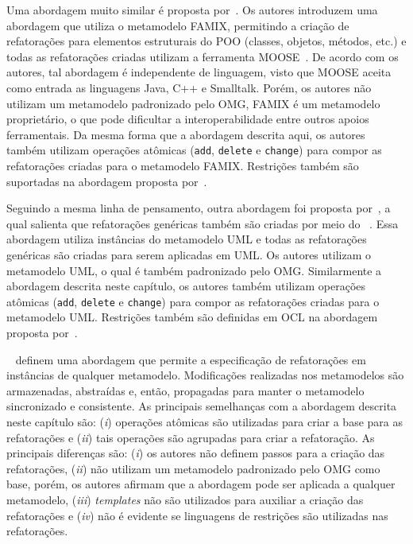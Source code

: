 Uma abordagem muito similar é proposta por~. Os autores introduzem uma abordagem que utiliza o metamodelo FAMIX, permitindo a criação de refatorações para elementos estruturais do POO (classes, objetos, métodos, etc.) e todas as refatorações criadas utilizam a ferramenta MOOSE~\cite{ducasse2005moose}. De acordo com os autores, tal abordagem é independente de linguagem, visto que MOOSE aceita como entrada as linguagens Java, C++ e Smalltalk. Porém, os autores não utilizam um metamodelo padronizado pelo OMG, FAMIX é um metamodelo proprietário, o que pode dificultar a interoperabilidade entre outros apoios ferramentais. Da mesma forma que a abordagem descrita aqui, os autores também utilizam operações atômicas (\texttt{add}, \texttt{delete} e \texttt{change}) para compor as refatorações criadas para o metamodelo FAMIX. Restrições também são suportadas na abordagem proposta por~.  


Seguindo a mesma linha de pensamento, outra abordagem foi proposta por~, a qual salienta que refatorações genéricas também são criadas por meio do ~\cite{ledeczi2001generic}. Essa abordagem utiliza instâncias do metamodelo UML e todas as refatorações genéricas são criadas para serem aplicadas em UML. Os autores utilizam o metamodelo UML, o qual é também padronizado pelo OMG. Similarmente a abordagem descrita neste capítulo, os autores também utilizam operações atômicas (\texttt{add}, \texttt{delete} e \texttt{change}) para compor as refatorações criadas para o metamodelo UML. Restrições também são definidas em OCL na abordagem proposta por~.  



~ definem uma abordagem que permite a especificação de refatorações em instâncias de qualquer metamodelo. Modificações realizadas nos metamodelos são armazenadas, abstraídas e, então, propagadas para manter o metamodelo sincronizado e consistente. As principais semelhanças com a abordagem descrita neste capítulo são: (\textit{i}) operações atômicas são utilizadas para criar a base para as refatorações e (\textit{ii}) tais operações são agrupadas para criar a refatoração. As principais diferenças são: (\textit{i}) os autores não definem passos para a criação das refatorações, (\textit{ii}) não utilizam um metamodelo padronizado pelo OMG como base, porém, os autores afirmam que a abordagem pode ser aplicada a qualquer metamodelo, (\textit{iii}) \textit{templates} não são utilizados para auxiliar a criação das refatorações e (\textit{iv}) não é evidente se linguagens de restrições são utilizadas nas refatorações. 

